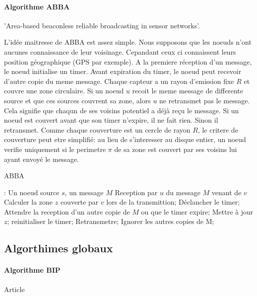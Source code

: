 \paragraph{Algorithme ABBA}
'Area-based beaconless reliable broadcasting in
sensor networks'\cite{Abba2006}.

L'idée maitresse de ABBA est assez simple. Nous supposons que les noeuds n'ont aucunes connaissance de leur voisinage. Cepandant ceux ci connaissent leurs position géographique (GPS par exemple).
A la premiere réception d'un message, le noeud initialise un timer. Avant expiration du timer, le noeud peut recevoir d'autre copie du meme message. Chaque capteur a un rayon d'emission fixe $R$
et couvre une zone circulaire. Si un noeud $u$ recoit le meme message de differente source et que ces sources couvrent sa zone, alors $u$ ne retransmet pas le message.
Cela signifie que chaqun de ses voisins potentiel a déjà reçu le message. Si un noeud est couvert avant que son timer n'expire, il ne fait rien. Sinon il retransmet.
Comme chaque couverture est un cercle de rayon $R$, le critere de couverture peut etre simplifié: au lieu de s'interesser au disque entier, un noeud verifie uniquement si le perimetre $\pi$ de sa zone est couvert par 
ses voisins lui ayant envoyé le message. 

\begin{algorithm}[h]
\caption{ABBA}
\label{ABBA}
\begin{algorithmic}
\REQUIRE:
Un noeud source $s$, un message $M$
\STATE Reception  par  $u$ du message $M$ venant de $v$
\STATE Calculer la zone $z$ couverte par $v$ lors de la transmittion;
\STATE Déclancher le timer;
\REPEAT
    \STATE Attendre la reception d'un autre copie de $M$ ou que le timer expire;
	\STATE Mettre à jour $z$;
	\STATE reinitialiser le timer;
    \ENDIF
{}
    \STATE Retransmetre;
\ENDIF
     \STATE Ignorer les autres copies de M;

\end{algorithmic}
\end{algorithm}




\subsection{Algorthimes globaux}
\paragraph{Algorithme BIP}
Article \cite{Wieselthier2000}

